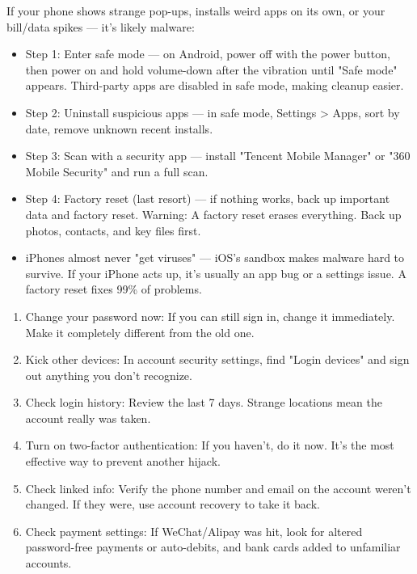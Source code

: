 
If your phone shows strange pop-ups, installs weird apps on its own, or your bill/data spikes — it's likely malware:

\begin{itemize}
  \item Step 1: Enter safe mode — on Android, power off with the power button, then power on and hold volume-down after the vibration until "Safe mode" appears. Third-party apps are disabled in safe mode, making cleanup easier.
  \item Step 2: Uninstall suspicious apps — in safe mode, Settings > Apps, sort by date, remove unknown recent installs.
  \item Step 3: Scan with a security app — install "Tencent Mobile Manager" or "360 Mobile Security" and run a full scan.
  \item Step 4: Factory reset (last resort) — if nothing works, back up important data and factory reset. Warning: A factory reset erases everything. Back up photos, contacts, and key files first.
  \item iPhones almost never "get viruses" — iOS's sandbox makes malware hard to survive. If your iPhone acts up, it's usually an app bug or a settings issue. A factory reset fixes 99\% of problems.
\end{itemize}


\begin{enumerate}
  \item Change your password now: If you can still sign in, change it immediately. Make it completely different from the old one.
  \item Kick other devices: In account security settings, find "Login devices" and sign out anything you don't recognize.
  \item Check login history: Review the last 7 days. Strange locations mean the account really was taken.
  \item Turn on two-factor authentication: If you haven't, do it now. It's the most effective way to prevent another hijack.
  \item Check linked info: Verify the phone number and email on the account weren't changed. If they were, use account recovery to take it back.
  \item Check payment settings: If WeChat/Alipay was hit, look for altered password-free payments or auto-debits, and bank cards added to unfamiliar accounts.
\end{enumerate}


